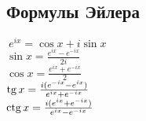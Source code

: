 \subsection{Формулы Эйлера}

$~e^{ix}=\cos x+i\sin x$ \\
$\sin x=\frac{e^{ix}-e^{-ix}}{2i}$ \\
$\cos x=\frac{e^{ix}+e^{-ix}}{2}$ \\
$\operatorname{tg} x = \frac{i(e^{-ix}-e^{ix})}{e^{ix}+e^{-ix}}$ \\
$\operatorname{ctg} x = \frac{i(e^{ix}+e^{-ix})}{e^{ix}-e^{-ix}}$ \\

